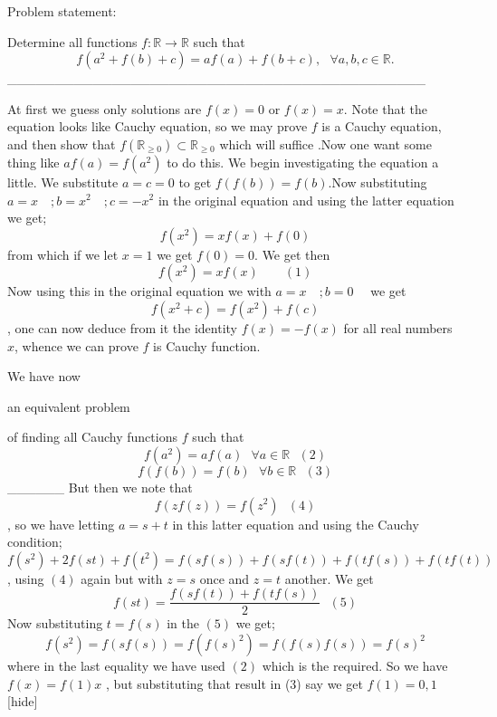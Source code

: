 \begin{solution} \begin{bolded}Problem statement: \end{bolded}Determine all functions $ f :\mathbb{R}\to\mathbb{R} $ such that
 \[ f(a^2+f(b)+c) = af(a)+f(b+c) ,\ \ \ \forall a,b,c\in\mathbb{R}. \] 
____________________________________________


At first we guess only solutions are $f(x)=0$ or $f(x)=x$. Note that the equation looks like Cauchy equation, so we may prove $f$ is a Cauchy equation, and then show that $f(\mathbb{R}_{\geq0}) \subset \mathbb{R}_{\geq0}$ which will suffice .Now one want some thing like $af(a)=f(a^2)$ to do this. We begin investigating the equation  a little. We substitute $a=c=0$ to get $f(f(b))=f(b)$.Now substituting $a=x\quad ;b=x^2 \quad ; c=-x^2$ in the original equation and using the latter equation we get; \[ f(x^2)=xf(x)+f(0)\] from which if we let $x=1$ we get $f(0)=0$. We get then \[f(x^2) = xf(x) \qquad (1)\] Now using this in the original equation we with $a=x \quad;b=0 \quad $ we get \[f(x^2 + c) = f(x^2) + f(c)\], one can now deduce from it the identity $f(x)=-f(x)$ for all real numbers $x$, whence we can prove $f$ is Cauchy function. 

We have now \begin{bolded}an equivalent problem\end{bolded} of finding all Cauchy functions $f$ such that \[f(a^2) = a f(a)  \ \ \ \forall a \in \mathbb{R} \ \ \ (2) \]
\[ f(f(b)) = f(b) \ \ \ \forall b\in \mathbb{R} \ \ \ (3)\]
______
But then we note that \[f(zf(z))=f(z^2) \ \ \ (4)\], so we have letting $a=s+t$ in this latter equation and using the Cauchy condition; \[f(s^2) + 2 f(st) + f(t^2) = f(sf(s)) + f(sf(t)) + f(tf(s)) + f(tf(t))\], using $(4)$ again but with $z=s$ once and $z=t$ another. We get \[f(st)= \frac{f(sf(t))+f(tf(s))}{2} \ \ \ (5) \] Now substituting $t=f(s)$ in the $(5)$ we get; \[f(s^2) = f(sf(s)) = f(f(s)^2) = f(f(s)f(s)) = f(s)^2\] where in the last equality we have used $(2)$ which is the required. So we have $f(x) = f(1) x$ , but substituting that result in (3) say we get $f(1)=0,1$[\/hide]
\end{solution}



